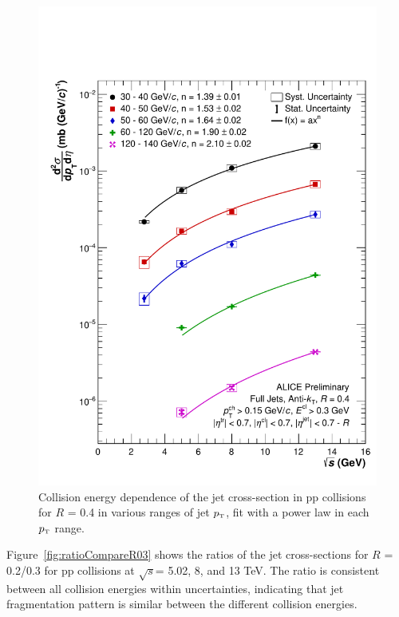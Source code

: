 \documentclass[ALICE]{ALICE_analysis_notes}
\newcommand{\pT}{$p_{\mbox{\tiny T}}$\xspace}
\newcommand{\s}{$\sqrt{s}$\xspace}
\newcommand{\pp}{pp\xspace}
\begin{document}
\begin{figure}[hbt!]
    \centering
    \includegraphics[width=\textwidth]{figures/EnergyComparisons/sqrtSComp_R04.pdf}
    \caption{Collision energy dependence of the jet cross-section in \pp collisions for $R$ = 0.4 in various ranges of jet \pT, fit with a power law in each \pT range.}
    \label{fig:sqrtSCompareR04}
\end{figure}

Figure~\ref{fig:ratioCompareR03} shows the ratios of the jet cross-sections for $R$ = 0.2/0.3 for \pp collisions at \s = 5.02, 8, and 13 TeV. The ratio is consistent between all collision energies within uncertainties, indicating that jet fragmentation pattern is similar between the different collision energies.
\end{document}

